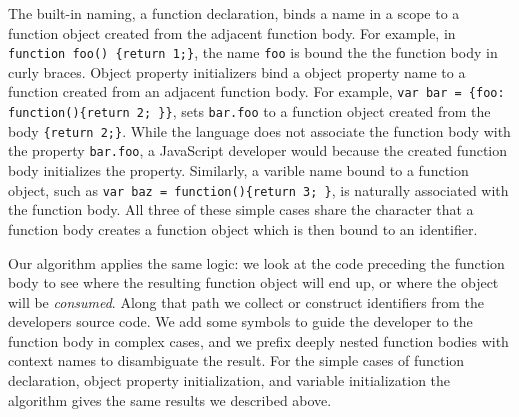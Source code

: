 \documentclass[10pt, preprint]{sigplanconf}
\begin{document}
{The built-in naming, a function declaration, binds a name in a scope to a function object created from the adjacent function body. For example, in  {\small\texttt{function foo() \{return 1;\}}}, the name  {\small\texttt{foo}} is bound the the function body in curly braces.
Object property initializers bind a object property name to a function created from an adjacent function body. For example,  {\small\texttt{var bar = \{foo: function()\{return 2; \}\}}}, sets {\small\texttt{bar.foo}} to a function object created from the body {\small\texttt{\{return 2;\}}}. While the language does not associate the function body with the property  {\small\texttt{bar.foo}}, a JavaScript developer would because the created function body initializes the property. Similarly, a varible name bound to a function object, such as {\small\texttt{var baz = function()\{return 3; \}}}, is naturally associated with the function body. All three of these simple cases share the character that a function body creates a function object which is then bound to an identifier. 

Our algorithm applies the same logic: we look at the code preceding the function body to see where the resulting function object will end up, or
where the object will be \textit{consumed}. Along that path we collect or construct identifiers from the developers source code. We add some symbols to guide the developer to the function body in complex cases, and we prefix deeply nested function bodies with context names to disambiguate the result.
For the simple cases of function declaration, object property initialization, and variable initialization the algorithm gives the same results we described above. 



}
\end{document}
